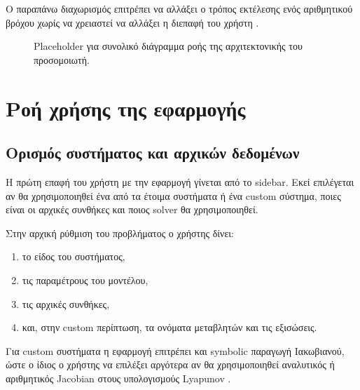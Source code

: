Ο παραπάνω διαχωρισμός επιτρέπει να αλλάξει ο τρόπος εκτέλεσης ενός αριθμητικού
βρόχου χωρίς να χρειαστεί να αλλάξει η διεπαφή του χρήστη
\cite{nlds_src_app_main,nlds_src_ui_bifurcation_tab,nlds_src_app_cache,nlds_src_core_solver,nlds_src_core_lyapunov}.

\begin{figure}[H]
\centering
{}
\caption{Placeholder για συνολικό διάγραμμα ροής της αρχιτεκτονικής του προσομοιωτή.}
\label{fig:ch2-architecture-placeholder}
\end{figure}

\section{Ροή χρήσης της εφαρμογής}
\label{sec:ch2-ui-flow}

\subsection{Ορισμός συστήματος και αρχικών δεδομένων}
\label{subsec:ch2-system-setup}

Η πρώτη επαφή του χρήστη με την εφαρμογή γίνεται από το sidebar. Εκεί
επιλέγεται αν θα χρησιμοποιηθεί ένα από τα έτοιμα συστήματα ή ένα custom
σύστημα, ποιες είναι οι αρχικές συνθήκες και ποιος solver θα χρησιμοποιηθεί.

\begin{guidebox}
Στην αρχική ρύθμιση του προβλήματος ο χρήστης δίνει:
\begin{enumerate}
\item το είδος του συστήματος,
\item τις παραμέτρους του μοντέλου,
\item τις αρχικές συνθήκες,
\item και, στην custom περίπτωση, τα ονόματα μεταβλητών και τις εξισώσεις.
\end{enumerate}
\end{guidebox}

Για custom συστήματα η εφαρμογή επιτρέπει και symbolic παραγωγή Ιακωβιανού,
ώστε ο ίδιος ο χρήστης να επιλέξει αργότερα αν θα χρησιμοποιηθεί αναλυτικός ή
αριθμητικός Jacobian στους υπολογισμούς Lyapunov
\cite{nlds_src_app_main,nlds_src_app_numba_custom,nlds_src_core_lyapunov}.

